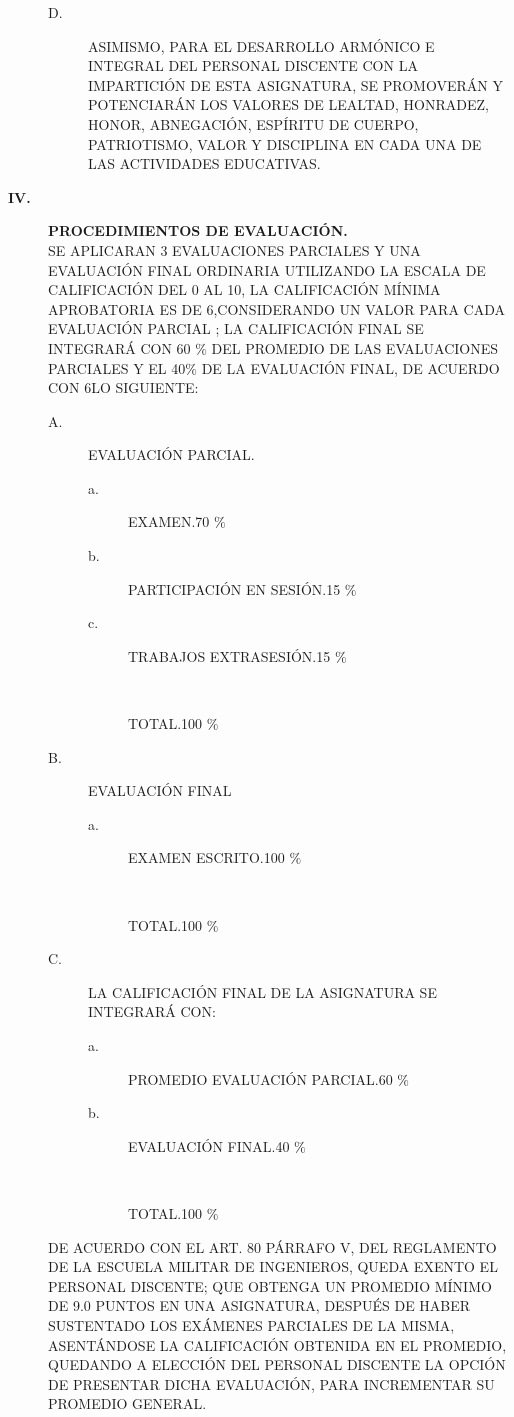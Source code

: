 \documentclass{myarticle}
\def\lineach#1#2{
#1\hfill #2
}
\begin{document}
\begin{description}
\begin{description}
\item[D.]ASIMISMO, PARA EL DESARROLLO ARMÓNICO E INTEGRAL DEL PERSONAL DISCENTE CON LA IMPARTICIÓN DE ESTA ASIGNATURA, SE PROMOVERÁN Y POTENCIARÁN LOS VALORES DE LEALTAD, HONRADEZ, HONOR, ABNEGACIÓN, ES\-PÍ\-RI\-TU DE CUERPO, PATRIOTISMO, VALOR Y DISCIPLINA EN CADA UNA DE LAS ACTIVIDADES EDUCATIVAS.
\end{description}
\item[{\large{\bf IV.}}] {\large{\bf PROCEDIMIENTOS DE EVALUACIÓN.}}\\ SE APLICARAN 3 EVALUACIONES PARCIALES Y UNA E\-VA\-LUA\-CIÓN FINAL ORDINARIA UTILIZANDO LA ESCALA DE CALIFICACIÓN DEL 0 AL 10, LA CALIFICACIÓN MÍNIMA APROBATORIA ES DE 6,CONSIDERANDO UN VALOR PARA CADA EVALUACIÓN PARCIAL ; 
LA CALIFICACIÓN FINAL SE INTEGRARÁ CON 60 $\%$ DEL PROMEDIO DE LAS EVALUACIONES PARCIALES Y EL 40$\%$ DE LA EVALUACIÓN FINAL, DE ACUERDO CON 6LO SIGUIENTE:
\begin{description}
\item[A.]EVALUACIÓN PARCIAL.
\begin{description}
\item[a.]\lineach{EXAMEN.}{70 $\%$}
\item[b.]\lineach{PARTICIPACIÓN EN SESIÓN.}{15 $\%$}
\item[c.]\lineach{TRABAJOS EXTRASESIÓN.}{15 $\%$}
\item[\ \ ]\lineach{TOTAL.}{100 $\%$}
\end{description}
\item[B.]EVALUACIÓN FINAL
\begin{description}
\item[a.]\lineach{EXAMEN ESCRITO.}{100 $\%$}
\item[\ \ ]\lineach{TOTAL.}{100 $\%$}
\end{description}
\item[C.]LA CALIFICACIÓN FINAL DE LA ASIGNATURA SE INTEGRARÁ CON:
\begin{description}
\item[a.]\lineach{PROMEDIO EVALUACIÓN PARCIAL.}{60 $\%$}
\item[b.]\lineach{EVALUACIÓN FINAL.}{40 $\%$}
\item[\ \ ]\lineach{TOTAL.}{100 $\%$}
\end{description}
\end{description}
DE ACUERDO CON EL ART. 80 PÁRRAFO V, DEL REGLAMENTO DE LA ESCUELA MILITAR 
DE INGENIEROS, QUEDA EXENTO EL PERSONAL DISCENTE; QUE OBTENGA UN PROMEDIO 
MÍNIMO DE 9.0 PUNTOS EN UNA ASIGNATURA, DESPUÉS DE HABER SUSTENTADO LOS 
EXÁMENES PARCIALES DE LA MISMA, A\-SEN\-TÁN\-DO\-SE LA CALIFICACIÓN 
OBTENIDA EN EL PROMEDIO, QUE\-DAN\-DO A ELECCIÓN DEL PERSONAL DISCENTE LA 
OPCIÓN DE PRESENTAR DICHA EVALUACIÓN, PARA INCREMENTAR SU PRO\-ME\-DIO 
GENERAL.


\end{description}
\end{document}
